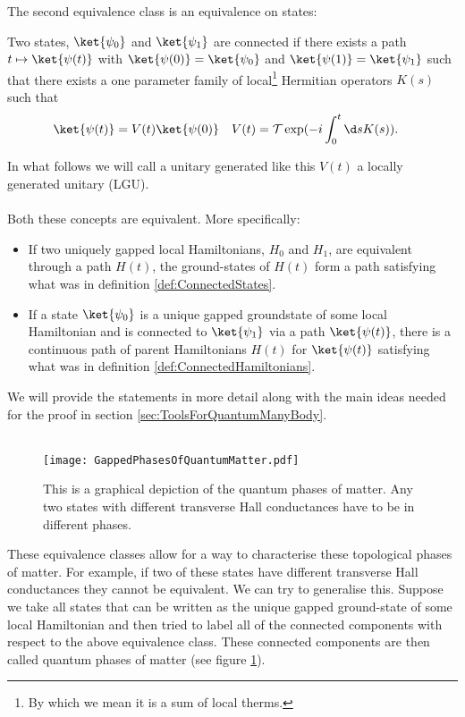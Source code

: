 The second equivalence class is an equivalence on states:
\begin{definition}\label{def:ConnectedStates}
	Two states, $\ket{\psi_0}$ and $\ket{\psi_1}$ are connected if there exists a path $t\mapsto \ket{\psi(t)}$ with $\ket{\psi(0)}=\ket{\psi_0}$ and $\ket{\psi(1)}=\ket{\psi_1}$ such that there exists a one parameter family of local\footnote{By which we mean it is a sum of local therms.} Hermitian operators $K(s)$ such that
	\begin{align}
		\ket{\psi(t)}&=V(t)\ket{\psi(0)}&V(t)&=\mathcal{T}\exp(-i\int_{0}^{t}\d s K(s)).
	\end{align}
\end{definition}
In what follows we will call a unitary generated like this $V(t)$ a locally generated unitary (LGU).\\\\
Both these concepts are equivalent. More specifically:
\begin{itemize}
	\item If two uniquely gapped local Hamiltonians, $H_0$ and $H_1$, are equivalent through a path $H(t)$, the ground-states of $H(t)$ form a path satisfying what was in definition \ref{def:ConnectedStates}.
	\item If a state $\ket{\psi_0}$ is a unique gapped groundstate of some local Hamiltonian and is connected to $\ket{\psi_1}$ via a path $\ket{\psi(t)}$, there is a continuous path of parent Hamiltonians $H(t)$ for $\ket{\psi(t)}$ satisfying what was in definition \ref{def:ConnectedHamiltonians}.
\end{itemize}
We will provide the statements in more detail along with the main ideas needed for the proof in section \ref{sec:ToolsForQuantumManyBody}.\\\\
\begin{figure}
	\centering
	\texttt{[image: GappedPhasesOfQuantumMatter.pdf]}
	\caption{This is a graphical depiction of the quantum phases of matter. Any two states with different transverse Hall conductances have to be in different phases.}
	\label{fig:GappedPhasesOfQuantumMatter}
\end{figure}
These equivalence classes allow for a way to characterise these topological phases of matter. For example, if two of these states have different transverse Hall conductances they cannot be equivalent. We can try to generalise this. Suppose we take all states that can be written as the unique gapped ground-state of some local Hamiltonian and then tried to label all of the connected components with respect to the above equivalence class. These connected components are then called quantum phases of matter (see figure \ref{fig:GappedPhasesOfQuantumMatter}).
